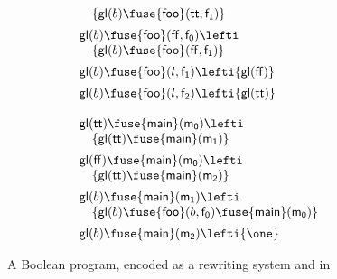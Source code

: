 \begin{figure}
\[\begin{array}{l}
\quad \{ {\sf gl}(b) \fuse {\sf foo}({\sf tt}, {\sf f_1}) \}\\[5pt]
{\sf gl}(b) \fuse {\sf foo}({\sf ff}, {\sf f_0}) \lefti ~\\
\quad \{ {\sf gl}(b) \fuse {\sf foo}({\sf ff}, {\sf f_1}) \}\\[5pt]
{\sf gl}(b) \fuse {\sf foo}(l, {\sf f_1}) \lefti \{ {\sf gl}({\sf ff}) \}\\[5pt]
{\sf gl}(b) \fuse {\sf foo}(l, {\sf f_2}) \lefti \{ {\sf gl}({\sf tt}) \}\\
\\
{\sf gl}({\sf tt}) \fuse {\sf main}({\sf m_0}) \lefti ~\\
\quad \{ {\sf gl}({\sf tt}) \fuse {\sf main}({\sf m_1}) \}\\[5pt]
{\sf gl}({\sf ff}) \fuse {\sf main}({\sf m_0}) \lefti ~\\
\quad \{ {\sf gl}({\sf tt}) \fuse {\sf main}({\sf m_2})\}\\[5pt]
{\sf gl}(b) \fuse {\sf main}({\sf m_1}) \lefti ~\\
\quad \{ {\sf gl}(b) \fuse {\sf foo}(b,{\sf f_0}) \fuse {\sf main}({\sf m_0})\}\\[5pt]
{\sf gl}(b) \fuse {\sf main}({\sf m_2}) \lefti \{ \one \}
\end{array}
\]
\caption{A Boolean program, encoded as a rewriting system and in \sls}
\end{figure}